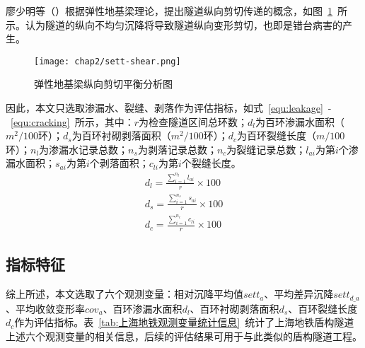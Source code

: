 廖少明等（\citeyear{廖少明2005隧道纵向剪切传递效应及其一维解析}）根据弹性地基梁理论，提出隧道纵向剪切传递的概念，如图~\ref{fig:弹性地基梁纵向剪切平衡分析图}~所示。认为隧道的纵向不均匀沉降将导致隧道纵向变形剪切，也即是错台病害的产生。

\begin{figure}[htbp]
    \centering
    \texttt{[image: chap2/sett-shear.png]}
    \caption{弹性地基梁纵向剪切平衡分析图}
    \label{fig:弹性地基梁纵向剪切平衡分析图}
\end{figure}

因此，本文只选取渗漏水、裂缝、剥落作为评估指标，如式~\ref{equ:leakage}~-~\ref{equ:cracking}~所示，其中：$r$为检查隧道区间总环数；${d}_{l}$为百环渗漏水面积（$m^2/100$环）；${d}_{s}$为百环衬砌剥落面积（$m^2/100$环）；${d}_{c}$为百环裂缝长度（$m/100$环）；${n}_{l}$为渗漏水记录总数；${n}_{s}$为剥落记录总数；${n}_{c}$为裂缝记录总数；${l}_{ai}$为第$i$个渗漏水面积；${s}_{ai}$为第$i$个剥落面积；${c}_{li}$为第$i$个裂缝长度。
\begin{align}
    \label{equ:leakage}
    {{d}_{l}}=\frac{\sum\limits_{i=1}^{{{n}_{l}}}{{{l}_{ai}}}}{r}\times 100 \\
    \label{equ:spalling}
    {{d}_{s}}=\frac{\sum\limits_{i=1}^{{{n}_{s}}}{{{s}_{ai}}}}{r}\times 100 \\
    \label{equ:cracking}
    {{d}_{c}}=\frac{\sum\limits_{i=1}^{{{n}_{c}}}{{{c}_{li}}}}{r}\times 100
\end{align}
\subsection{指标特征}

综上所述，本文选取了六个观测变量：相对沉降平均值${sett}_{a}$、平均差异沉降$set{{t}_{d\_a}}$、平均收敛变形率${cov}_{a}$、百环渗漏水面积${d}_{l}$、百环衬砌剥落面积${d}_{s}$、百环裂缝长度${d}_{c}$作为评估指标。表~\ref{tab:上海地铁观测变量统计信息}~统计了上海地铁盾构隧道上述六个观测变量的相关信息，后续的评估结果可用于与此类似的盾构隧道工程。

